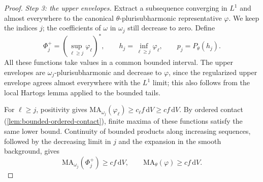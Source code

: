 \begin{proof}
\emph{Step 3: the upper envelopes.} Extract a subsequence converging in $L^1$ and almost everywhere to the canonical $\theta$-plurisubharmonic representative $\varphi$. We keep the indices $j$; the coefficients of $\omega$ in $\omega_j$ still decrease to zero. Define
\[
 \Phi_j^+=\left(\sup_{\ell\geq j}\varphi_\ell\right)^*,
 \qquad h_j=\inf_{\ell\geq j}\varphi_\ell,
 \qquad p_j=P_\theta(h_j).
\]
All these functions take values in a common bounded interval. The upper envelopes are $\omega_j$-plurisubharmonic and decrease to $\varphi$, since the regularized upper envelope agrees almost everywhere with the $L^1$ limit; this also follows from the local Hartogs lemma applied to the bounded tails.

For $\ell\geq j$, positivity gives $\mathrm{MA}_{\omega_j}(\varphi_\ell)\geq c_\ell f\,\mathrm{d}V\geq cf\,\mathrm{d}V$. By ordered contact (\cref{lem:bounded-ordered-contact}), finite maxima of these functions satisfy the same lower bound. Continuity of bounded products along increasing sequences, followed by the decreasing limit in $j$ and the expansion in the smooth background, gives
\begin{equation}\label{eq:big-normalized-upper-tail}
 \mathrm{MA}_{\omega_j}(\Phi_j^+)\geq cf\,\mathrm{d}V,
 \qquad \mathrm{MA}_\theta(\varphi)\geq cf\,\mathrm{d}V.
\end{equation}


\end{proof}

